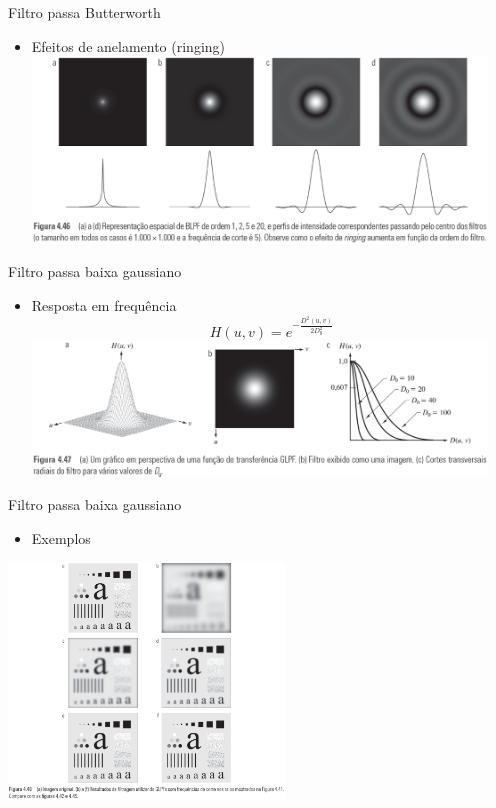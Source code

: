       \begin{slide}[toc=]{Filtro passa Butterworth}
         \begin{itemize}[type=1]
            \item Efeitos de anelamento (ringing)
            \includegraphics[width=0.95\textwidth]{figs/fig0446}
         \end{itemize}
      \end{slide}
      
      \begin{slide}[toc=]{Filtro passa baixa gaussiano}
         \begin{itemize}[type=1]
            \item Resposta em frequência
            \begin{equation*}
               H(u,v) = e^{-\frac{D^2(u,v)}{2D^2_0}}
            \end{equation*}
            \includegraphics[width=0.95\textwidth]{figs/fig0447}
         \end{itemize}
      \end{slide}
      
      \begin{slide}[toc=]{Filtro passa baixa gaussiano}
         \begin{itemize}[type=1]
            \item Exemplos
         \end{itemize}
	      \begin{center}
            \includegraphics[width=0.55\textwidth]{figs/fig0448}
	      \end{center}
      \end{slide}
   
